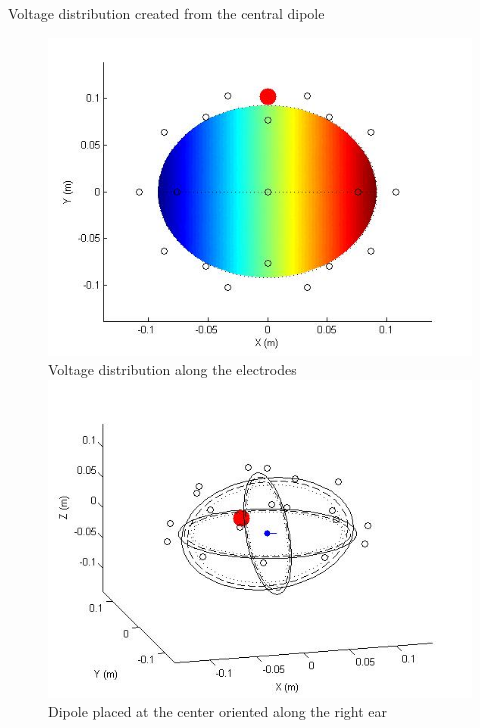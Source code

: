 \documentclass[t,12pt,english
\ifx\beamermode\undefined\else,\beamermode\fi
]{beamer}
\begin{document}
\begin{frame}{Voltage distribution created from the central dipole}

\begin{figure}[!htbp]
%
\centering
\includegraphics[width=1\textwidth]{4.jpg}\\
\tiny{Voltage distribution along the electrodes}\label{a2}
\endminipage\hfill
{}%
\centering
\includegraphics[width=1\textwidth]{5.jpg}\\
\tiny{Dipole placed at the center oriented along the right ear}\label{a1}
\endminipage\hfill
\end{figure}

\end{frame}
\end{document}
